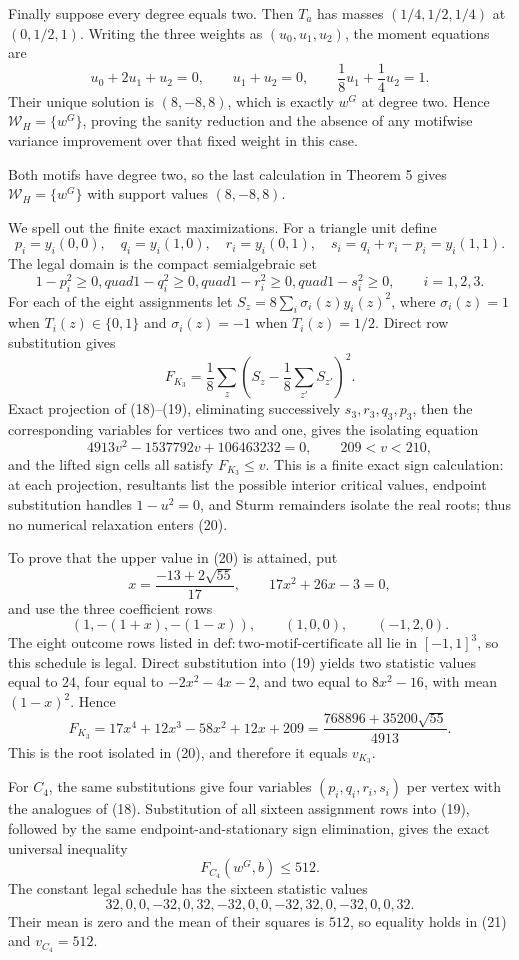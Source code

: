 Finally suppose every degree equals two.  Then \(T_a\) has masses \((1/4,1/2,1/4)\) at \((0,1/2,1)\).  Writing the three weights as \((u_0,u_1,u_2)\), the moment equations are
\[
u_0+2u_1+u_2=0,
\qquad u_1+u_2=0,
\qquad \frac18u_1+\frac14u_2=1.
\]
Their unique solution is \((8,-8,8)\), which is exactly \(w^G\) at degree two.  Hence \(\mathcal W_H=\{w^G\}\), proving the sanity reduction and the absence of any motifwise variance improvement over that fixed weight in this case.

Both motifs have degree two, so the last calculation in Theorem 5 gives \(\mathcal W_H=\{w^G\}\) with support values \((8,-8,8)\).

We spell out the finite exact maximizations.  For a triangle unit define
\[
p_i=y_i(0,0),\quad q_i=y_i(1,0),\quad r_i=y_i(0,1),
\quad s_i=q_i+r_i-p_i=y_i(1,1).
\]
The legal domain is the compact semialgebraic set
\[
1-p_i^2\ge0,quad1-q_i^2\ge0,quad1-r_i^2\ge0,quad1-s_i^2\ge0,
\qquad i=1,2,3. \tag{18}
\]
For each of the eight assignments let \(S_z=8\sum_i\sigma_i(z)y_i(z)^2\), where \(\sigma_i(z)=1\) when \(T_i(z)\in\{0,1\}\) and \(\sigma_i(z)=-1\) when \(T_i(z)=1/2\).  Direct row substitution gives
\[
F_{K_3}=\frac18\sum_z\left(S_z-\frac18\sum_{z'}S_{z'}\right)^2. \tag{19}
\]
Exact projection of (18)--(19), eliminating successively \(s_3,r_3,q_3,p_3\), then the corresponding variables for vertices two and one, gives the isolating equation
\[
4913v^2-1537792v+106463232=0,
\qquad 209<v<210, \tag{20}
\]
and the lifted sign cells all satisfy \(F_{K_3}\le v\).  This is a finite exact sign calculation: at each projection, resultants list the possible interior critical values, endpoint substitution handles \(1-u^2=0\), and Sturm remainders isolate the real roots; thus no numerical relaxation enters (20).

To prove that the upper value in (20) is attained, put
\[
x=\frac{-13+2\sqrt{55}}{17},\qquad17x^2+26x-3=0,
\]
and use the three coefficient rows
\[
(1,-(1+x),-(1-x)),\qquad(1,0,0),\qquad(-1,2,0).
\]
The eight outcome rows listed in \(\mathrm{def:two\text{-}motif\text{-}certificate}\) all lie in \([-1,1]^3\), so this schedule is legal.  Direct substitution into (19) yields two statistic values equal to \(24\), four equal to \(-2x^2-4x-2\), and two equal to \(8x^2-16\), with mean \((1-x)^2\).  Hence
\[
F_{K_3}=17x^4+12x^3-58x^2+12x+209
=\frac{768896+35200\sqrt{55}}{4913}.
\]
This is the root isolated in (20), and therefore it equals \(v_{K_3}\).

For \(C_4\), the same substitutions give four variables \((p_i,q_i,r_i,s_i)\) per vertex with the analogues of (18).  Substitution of all sixteen assignment rows into (19), followed by the same endpoint-and-stationary sign elimination, gives the exact universal inequality
\[
F_{C_4}(w^G,b)\le512. \tag{21}
\]
The constant legal schedule has the sixteen statistic values
\[
32,0,0,-32,0,32,-32,0,0,-32,32,0,-32,0,0,32.
\]
Their mean is zero and the mean of their squares is \(512\), so equality holds in (21) and \(v_{C_4}=512\).

